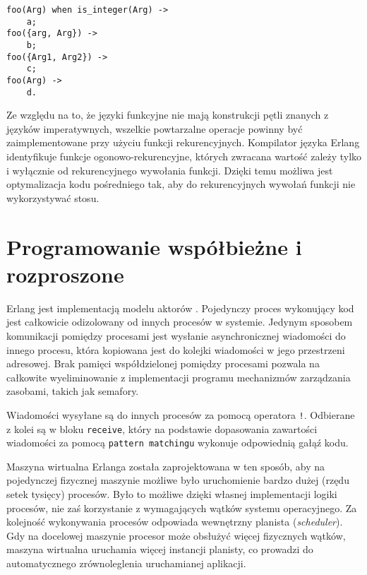 \begin{lstlisting}[style=erlang, caption=Przykład \emph{pattern matchingu}, label=lis:patternmatching]
foo(Arg) when is_integer(Arg) ->
    a;
foo({arg, Arg}) ->
    b;
foo({Arg1, Arg2}) ->
    c;
foo(Arg) ->
    d.
\end{lstlisting}

Ze względu na to, że języki funkcyjne nie mają konstrukcji pętli znanych z języków imperatywnych, wszelkie powtarzalne operacje powinny być zaimplementowane przy użyciu funkcji rekurencyjnych.
Kompilator języka Erlang identyfikuje funkcje ogonowo-rekurencyjne, których zwracana wartość zależy tylko i wyłącznie od rekurencyjnego wywołania funkcji. Dzięki temu możliwa jest optymalizacja kodu pośredniego tak, aby do rekurencyjnych wywołań funkcji nie wykorzystywać stosu.

\section{Programowanie współbieżne i rozproszone}
\label{sec:erlangConcurrent}

Erlang jest implementacją modelu aktorów \cite{Hewitt73}.
Pojedynczy proces wykonujący kod jest całkowicie odizolowany od innych procesów w systemie.
Jedynym sposobem komunikacji pomiędzy procesami jest wysłanie asynchronicznej wiadomości do innego procesu, która kopiowana jest do kolejki wiadomości w jego przestrzeni adresowej.
Brak pamięci współdzielonej pomiędzy procesami pozwala na całkowite wyeliminowanie z implementacji programu mechanizmów zarządzania zasobami, takich jak semafory. 

Wiadomości wysyłane są do innych procesów za pomocą operatora \texttt{!}.
Odbierane z kolei są w bloku \texttt{receive}, który na podstawie dopasowania zawartości wiadomości za pomocą \texttt{pattern matchingu} wykonuje odpowiednią gałąź kodu.

Maszyna wirtualna Erlanga została zaprojektowana w ten sposób, aby na pojedynczej fizycznej maszynie możliwe było uruchomienie bardzo dużej (rzędu setek tysięcy) procesów. Było to możliwe dzięki własnej implementacji logiki procesów, nie zaś korzystanie z wymagających wątków systemu operacyjnego. Za kolejność wykonywania procesów odpowiada wewnętrzny planista (\emph{scheduler}).
Gdy na docelowej maszynie procesor może obsłużyć więcej fizycznych wątków, maszyna wirtualna uruchamia więcej instancji planisty, co prowadzi do automatycznego zrównoleglenia uruchamianej aplikacji.


